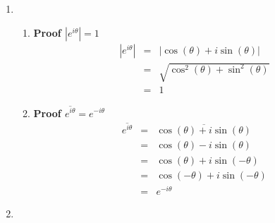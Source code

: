 \documentclass{article}%
\newcommand\abs[1]{\left|#1\right|}
\newenvironment{proof}[1][]{\begin{samepage}\textbf{Proof #1} }{\end{samepage}}
\begin{document}
\begin{enumerate}
\begin{enumerate}[label*=\arabic*.]
        \item %
        \begin{enumerate}[label=\alph*]
            \item %
            \begin{proof}[$\abs{e^{i \theta}}=1$]
                \begin{eqnarray*}
                    \abs{e^{i \theta}} &=& \abs{\cos(\theta) + i \sin(\theta)} \\
                                       &=& \sqrt{\cos^2(\theta) + \sin^2(\theta)} \\
                                       &=& 1
                \end{eqnarray*}
            \end{proof}
            \item %
            \begin{proof}[$\overline{e^{i\theta}}=e^{-i\theta}$]
                \begin{eqnarray*}
                    \overline{e^{i\theta}}&=& \overline{\cos(\theta) + i \sin(\theta)} \\
                                          &=& \cos(\theta) - i \sin(\theta) \\
                                          &=& \cos(\theta) + i \sin(-\theta) \\
                                          &=& \cos(-\theta) + i \sin(-\theta) \\
                                          &=& e^{-i\theta}
                \end{eqnarray*}
            \end{proof}
        \end{enumerate}
        \item
    \end{enumerate}
\end{enumerate}
\end{document}
